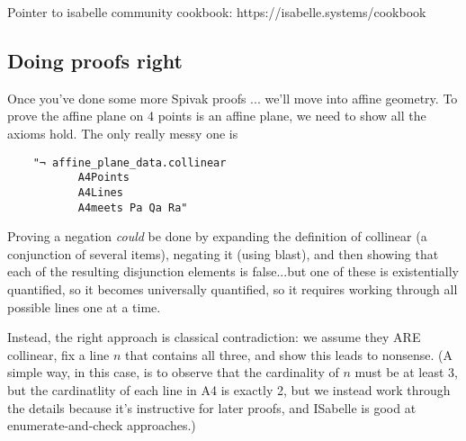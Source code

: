 Pointer to isabelle community cookbook: https://isabelle.systems/cookbook

\subsection{Doing proofs right}
Once you've done some more Spivak proofs ... we'll move into affine geometry. 
To prove the affine plane on 4 points is an affine plane, we need to show all the axioms hold. The only really messy one is 
\begin{verbatim}
    "¬ affine_plane_data.collinear
           A4Points
           A4Lines
           A4meets Pa Qa Ra"
\end{verbatim}
Proving a negation \textit{could} be done by expanding the definition of collinear (a conjunction of several items), negating it (using blast), and then showing that each of the resulting disjunction elements is false...but one of these is existentially quantified, so it becomes universally quantified, so it requires working through all possible lines one at a time. 

Instead, the right approach is classical contradiction: we assume they ARE collinear, fix a line $n$ that contains all three, and show this leads to nonsense. (A simple way, in this case, is to observe that the cardinality of $n$ must be at least 3, but the cardinatlity of each line in A4 is exactly 2, but we instead work through the details because it's instructive for later proofs, and ISabelle is good at enumerate-and-check approaches.) 

